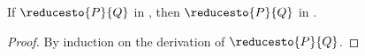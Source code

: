 \begin{theorem}\label{thm:cp2hcp-reduction}
  If $\reducesto{P}{Q}$ in \cp, then $\reducesto{P}{Q}$ in \hcp.
\end{theorem}
\begin{proof}
  By induction on the derivation of $\reducesto{P}{Q}$.
\end{proof}
